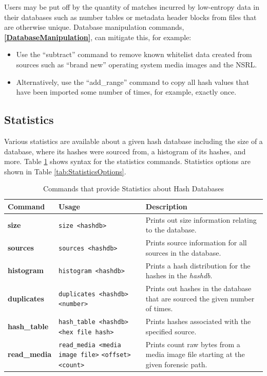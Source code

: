 \documentclass[11pt,fleqn]{article} %
\begin{document}
\begin{itemize}
Users may be put off by the quantity of matches incurred by low-entropy data in their databases such as number tables or metadata header blocks from files that are otherwise unique. Database manipulation commands,
\textbf{\autoref{DatabaseManipulation}}, can mitigate this, for example:
\begin{itemize}
\item Use the ``subtract'' command to remove known whitelist data created from sources such as ``brand new'' operating system media images and the NSRL.
\item Alternatively, use the ``add\_range'' command to copy all hash values that have been imported some number of times, for example, exactly once.
\end{itemize}

\end{itemize}

\subsection{Statistics}
Various statistics are available about a given hash database including the size of a database, where its hashes were sourced from, a histogram of its hashes, and more.
Table \ref{tab:statistics} shows syntax for the statistics commands.
Statistics options are shown in Table \ref{tab:StatisticsOptions}.
\begin{table}[!ht]
\centering
\caption{Commands that provide Statistics about Hash Databases}
\label{tab:statistics}
\begin{tabular}{|p{3.5 cm}|p{6 cm}|p{4 cm}|}
\hline \hline
\textbf{Command} & \textbf{Usage} & \textbf{Description} \\
\hline
\textbf{size} & \verb+size <hashdb>+ & Prints out size information relating to the database.\\
\hline
\textbf{sources} & \verb+sources <hashdb>+ & Prints source information for all sources in the database.\\
\hline
\textbf{histogram} & \verb+histogram <hashdb>+ & Prints a hash distribution for the hashes in the \textit{hashdb}.\\
\hline
\textbf{duplicates} & \verb+duplicates <hashdb> <number>+ &  Prints out hashes in the database that are sourced the given number of times.\\
\hline
\textbf{hash\_table} & \verb+hash_table <hashdb>+ \verb+<hex file hash>+ &  Prints hashes associated with the specified source.\\
\hline
\textbf{read\_media} & \verb+read_media <media image file>+ \verb+<offset> <count>+ &  Prints count raw bytes from a media image file starting at the given forensic path.\\
\hline
\end{tabular}
\end{table}
\end{document}
